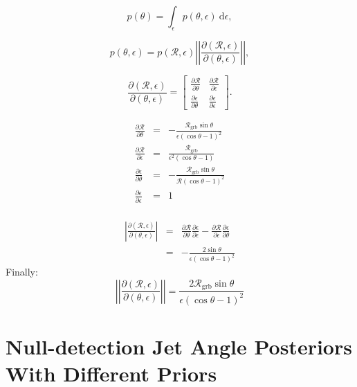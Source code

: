 \documentclass[twocolumn,nofootinbib]{revtex4-1}
\newcommand{\grbrate}{{{\mathcal R}_{\mathrm{grb}}}}
\newcommand{\cbcrate}{{{\mathcal R}}}
\newcommand{\diff}{{\mathrm d}}
\begin{document}
\begin{equation}
p(\theta) = \int_{\epsilon} p(\theta,\epsilon)~\diff \epsilon,
\end{equation}

\begin{equation}
p(\theta,\epsilon) = p(\cbcrate,\epsilon)
\left\lvert\left\lvert
\frac{\partial(\cbcrate,\epsilon)}{\partial(\theta,\epsilon)}
\right\rvert\right\rvert,
\end{equation}

\begingroup
\renewcommand*{\arraystretch}{1.5}

\begin{equation}
\frac{\partial (\cbcrate,\epsilon)}{\partial(\theta,\epsilon)} =
\begin{bmatrix}
\frac{\partial \cbcrate}{\partial \theta} & \frac{\partial \cbcrate}{\partial \epsilon} \\
\frac{\partial \epsilon}{\partial \theta} & \frac{\partial \epsilon}{\partial \epsilon}
\end{bmatrix}.
\end{equation}

\endgroup

\begin{eqnarray}
\frac{\partial \cbcrate}{\partial \theta} & = &
-\frac{\grbrate\sin\theta}{\epsilon(\cos\theta - 1)^2}\\
\frac{\partial \cbcrate}{\partial \epsilon} & = &
\frac{\grbrate}{\epsilon^2(\cos\theta-1)}\\
\frac{\partial \epsilon}{\partial \theta} & = &
-\frac{\grbrate\sin\theta}{\cbcrate(\cos\theta-1)^2}\\
\frac{\partial \epsilon}{\partial \epsilon} & = & 1\\
\end{eqnarray}

\begin{eqnarray}
\left\lvert
\frac{\partial(\cbcrate,\epsilon)}{\partial(\theta,\epsilon)}
\right\rvert & = & \frac{\partial \cbcrate}{\partial \theta}
\frac{\partial \epsilon}{\partial \epsilon} - \frac{\partial \cbcrate}{\partial
\epsilon}\frac{\partial \epsilon}{\partial \theta} \\
& = & -\frac{2\sin\theta}{\epsilon(\cos\theta-1)^2}
\end{eqnarray}
%
Finally:
\begin{equation}
\left\lvert\left\lvert
\frac{\partial(\cbcrate,\epsilon)}{\partial(\theta,\epsilon)}
\right\rvert\right\rvert = \frac{2\grbrate\sin\theta}{\epsilon(\cos\theta-1)^2} 
\end{equation}

\section{Null-detection Jet Angle Posteriors With Different Priors}


\end{document}
